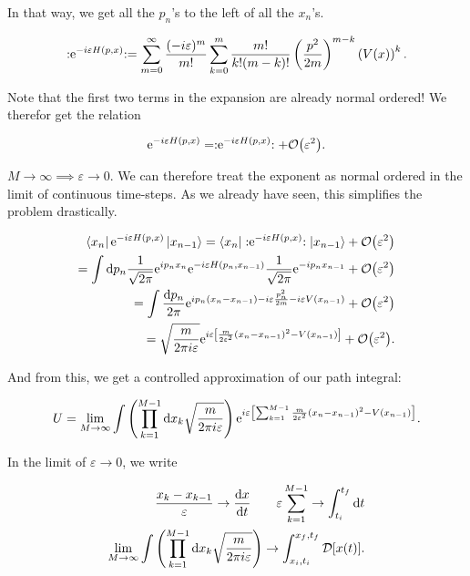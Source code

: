 In that way, we get all the $p_{n}$'s to the left of all the $x_{n}$'s. 

\begin{equation*}
    :\mathrel{\mathrm{e}^{-i\varepsilon H(p,x)}}: = \sum_{m = 0}^{\infty} \frac{(-i\varepsilon)^{m}}{m!} \sum_{k = 0}^{m} \frac{m!}{k! (m - k)!} \left(\frac{p^{2}}{2m}\right)^{m - k} \left(V(x)\right)^{k}.
\end{equation*}

Note that the first two terms in the expansion are already normal ordered! We therefor get the relation 

\begin{equation*}
    \e^{-i\varepsilon H(p,x)} = \normord{\e^{-i\varepsilon H(p,x)}} + \order{\varepsilon^{2}}. 
\end{equation*}

$M \to \infty \implies \varepsilon \to 0$. We can therefore treat the exponent as normal ordered in the limit of continuous time-steps. As we already have seen, this simplifies the problem drastically. 

\begin{align*}
    \bra{x_{n}}\e^{-i\varepsilon H(p,x)}\ket{x_{n-1}} = \bra{x_{n}}\normord{\e^{-i\varepsilon H(p,x)}}\ket{x_{n-1}} + \order{\varepsilon^{2}} \\ = \int \dd p_{n} \frac{1}{\sqrt{2\pi}}\e^{ip_{n}x_{n}}  \e^{-i \varepsilon H(p_{n}, x_{n-1})} \frac{1}{\sqrt{2\pi}} \e^{-ip_{n}x_{n-1}} + \order{\varepsilon^{2}} \\ = \int \frac{\dd p_{n}}{2\pi}  \e^{ip_{n}(x_{n} - x_{n-1}) -i \varepsilon \frac{p_{n}^{2}}{2m} - i\varepsilon V(x_{n-1})} + \order{\varepsilon^{2}} \\ = \sqrt{\frac{m}{2\pi i \varepsilon}}\e^{i\varepsilon \left[\frac{m}{2 \varepsilon^{2}} (x_{n} - x_{n-1})^{2} - V(x_{n-1})\right]} + \order{\varepsilon^{2}}.
\end{align*}

And from this, we get a controlled approximation of our path integral: 

\begin{equation*}
    U = \lim_{M \to \infty} \int \left( \prod_{k = 1}^{M-1} \dd x_{k} \sqrt{\frac{m}{2\pi i \varepsilon}} \right) \mathrm{e}^{i\varepsilon \left[\sum_{k = 1}^{M-1} \frac{m}{2 \varepsilon^{2}} (x_{n} - x_{n-1})^{2} - V(x_{n-1})\right]}. 
\end{equation*}

In the limit of $\varepsilon \to 0$, we write 

\begin{align*}
    \frac{x_{k} - x_{k-1}}{\varepsilon} \to \dv{x}{t} \quad \quad  \varepsilon \sum_{k = 1}^{M-1} \to  \int_{t_{i}}^{t_{f}} \dd t \\ \lim_{M \to \infty} \int \left( \prod_{k = 1}^{M-1} \dd x_{k} \sqrt{\frac{m}{2\pi i \varepsilon}} \right) \to \int_{x_{i}, t_{i}}^{x_{f},t{_f}} \mathcal{D}[x(t)]. 
\end{align*}

